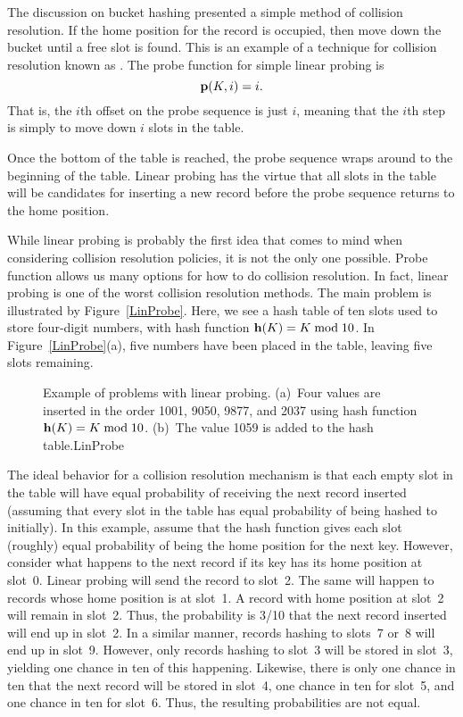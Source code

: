The discussion on bucket hashing presented a simple method of
collision resolution.
If the home position for the record is occupied, then move down
the bucket until a free slot is found.
This is an example of a technique for collision resolution
known as .
The probe function
for simple linear probing is
\[ {\bf p}(K, i) = i.\]
That is, the \(i\)th offset on the probe sequence is just \(i\),
meaning that the \(i\)th step is simply to move down \(i\)
slots in the table.

Once the bottom of the table is reached, the probe sequence
wraps around to the beginning of the table.
Linear probing has the virtue that all slots in the table will be
candidates for inserting a new record before the probe sequence
returns to the home position.

While linear probing is probably
the first idea that comes to mind when considering collision
resolution policies, it is not the only one possible.
Probe function  allows us many options for how to do collision
resolution.
In fact, linear probing is one of the worst collision resolution
methods.
The main problem is illustrated by Figure~\ref{LinProbe}.
Here, we see a hash table of ten slots used to store four-digit
numbers, with hash function \({\bf h}(K) = K \bmod 10\).
In Figure~\ref{LinProbe}(a), five numbers have been placed in the
table, leaving five slots remaining.

\begin{figure}
\vspace{-\bigskipamount}
{Example of problems with linear probing.
(a)~Four values are inserted in the order 1001, 9050, 9877, and 2037
using hash function \( {\bf h}(K) = K \bmod 10\).
(b)~The value 1059 is added to the hash table.}{LinProbe}
\medskip
\end{figure}

The ideal behavior for a collision resolution mechanism is that
each empty slot in the table will have equal probability of
receiving the next record inserted (assuming that every slot in the
table has equal probability of being hashed to initially).
In this example, assume that the hash function gives each slot
(roughly) equal probability of being the home position for the next
key.
However, consider what happens to the next record if its key has its
home position at slot~0.
Linear probing will send the record to slot~2.
The same will happen to records whose home position is at slot~1.
A record with home position at slot~2 will remain in slot~2.
Thus, the probability is 3/10 that the next record inserted will end
up in slot~2.
In a similar manner, records hashing to slots~7 or~8 will
end up in slot~9.
However, only records hashing to slot~3 will be stored in
slot~3, yielding one chance in ten of this happening.
Likewise, there is only one chance in ten that the next record will
be stored in slot~4, one chance in ten for slot~5, and one chance in
ten for slot~6.
Thus, the resulting probabilities are not equal.

